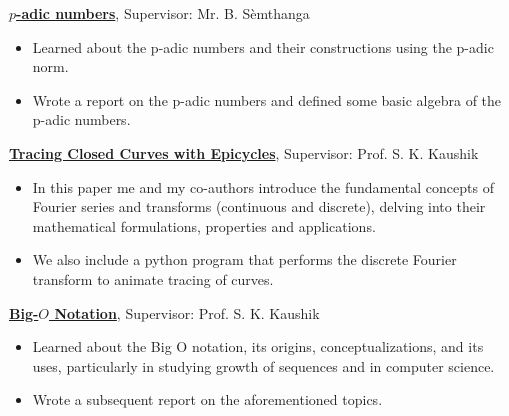 {}
{\href{https://drive.google.com/file/d/1ccd4o58qntyjndkokzaeszttc6epykrq/view?usp=sharing}
    {\textbf{$p$-adic numbers}}, Supervisor: Mr. B. Sèmthanga}
{
    \begin{itemize}
        \item Learned about the p-adic numbers and their constructions using the p-adic norm.
        \item Wrote a report on the p-adic numbers and defined some basic algebra of the p-adic numbers.
    \end{itemize}
}

{}
{\href{https://drive.google.com/file/d/11-x1EeIfJQ-dBzBWS3uMN9M7creMVBjU/view?usp=sharing}
    {\textbf{Tracing Closed Curves with Epicycles}}, Supervisor: Prof. S. K. Kaushik}
{
    \begin{itemize}
        \item In this paper me and my co-authors introduce the fundamental concepts of Fourier series and transforms (continuous and discrete), delving into their mathematical formulations, properties and applications.
        \item We also include a python program that performs the discrete Fourier transform to animate tracing of curves.
    \end{itemize}
}

{}
{\href{https://drive.google.com/file/d/17TYu954BWVxVPbyHTLwTCE6rcR60hcNU/view?usp=sharing}
    {\textbf{Big-$O$ Notation}}, Supervisor: Prof. S. K. Kaushik}
{
    \begin{itemize}
        \item Learned about the Big O notation, its origins, conceptualizations, and its uses, particularly in studying growth of sequences and in computer science.
        \item Wrote a subsequent report on the aforementioned topics.
    \end{itemize}
}
